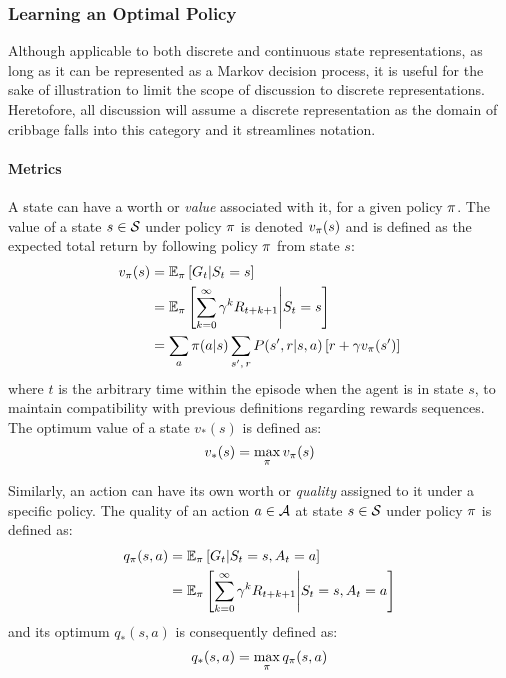 \subsubsection*{Learning an Optimal Policy}


%
Although applicable to both discrete and continuous state representations,
as long as it can be represented as a Markov decision process,
it is useful for the sake of illustration to limit the scope of discussion to
discrete representations.
%
Heretofore, %
all discussion will assume a discrete representation
as the domain of cribbage falls into this category
and it streamlines notation.

\paragraph*{Metrics}


A state can have a worth or \textit{value} associated with it,
for a given policy $\pi$.
%
The value of a state $s \in \mathcal{S}$ under policy $\pi$ is denoted
$v_\pi(s)$
and
is defined as the expected total return by following policy $\pi$ from
state $s$:
\begin{align*}
	v_\pi(s) &= \mathbb{E}_\pi\left[G_t \middle| S_t = s\right] \\
		&= \mathbb{E}_\pi \left[
				\sum_{k=0}^{\infty} \gamma^k R_{t+k+1} \middle| S_t = s
			\right]
		\\
		&= \sum_{a} {
				\pi(a|s)
				\sum_{s',\,r} {
					P(s',r|s,a) \left[
						r + \gamma v_{\pi}(s')
					\right]
				}
			}
\end{align*}
where $t$ is the arbitrary time within the episode
when the agent is in state $s$,
to maintain compatibility with previous definitions regarding rewards sequences.
%
The optimum value of a state $v_*(s)$ is defined as:
\[ v_*(s) = \max_\pi v_\pi(s) \]

Similarly,
an action can have its own worth or \textit{quality} assigned to it under a
specific policy.
%
The quality of an action $a\in\mathcal{A}$ at state $s\in\mathcal{S}$ under policy
$\pi$ is defined as:
\begin{align*}
	q_\pi(s,a)
		&= \mathbb{E}_\pi\left[ G_t \middle| S_t = s, A_t = a \right]
		\\
		&= \mathbb{E}_\pi\left[
				\sum_{k=0}^{\infty}\gamma^k R_{t+k+1} \middle| S_t = s, A_t = a
			\right]
\end{align*}
and its optimum $q_*(s,a)$ is consequently defined as:
\[
	q_*(s,a) = \max_{\pi}q_\pi(s,a)
\]

